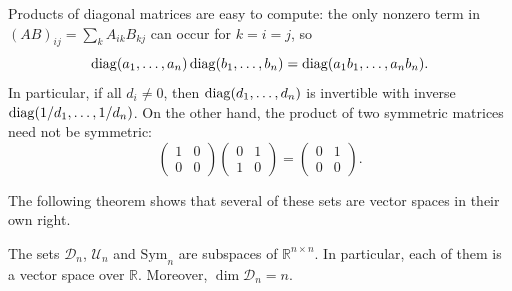 \begin{remark}
    Products of diagonal matrices are easy to compute: the only nonzero term in $(AB)_{ij} = \sum_k A_{ik} B_{kj}$ can occur for $k = i = j$, so
    \[\operatorname{diag}(a_1, \ldots, a_n) \operatorname{diag}(b_1, \ldots, b_n) = \operatorname{diag}(a_1 b_1, \ldots, a_n b_n).\]
    In particular, if all $d_i \neq 0$, then $\operatorname{diag}(d_1, \ldots, d_n)$ is invertible with inverse $\operatorname{diag}(1/d_1, \ldots, 1/d_n)$. On the other hand, the product of two symmetric matrices need not be symmetric:
    \[\begin{pmatrix}
        1 & 0 \\
        0 & 0
    \end{pmatrix} \begin{pmatrix}
        0 & 1 \\
        1 & 0
    \end{pmatrix} = \begin{pmatrix}
        0 & 1 \\
        0 & 0
    \end{pmatrix}.\]
\end{remark}

The following theorem shows that several of these sets are vector spaces in their own right.

\begin{theorem}\label{L1-thm:special-subspaces}
    The sets $\mathcal{D}_n$, $\mathcal{U}_n$ and $\mathrm{Sym}_n$ are subspaces of $\mathbb{R}^{n \times n}$. In particular, each of them is a vector space over $\mathbb{R}$. Moreover, $\dim \mathcal{D}_n = n$.
\end{theorem}


